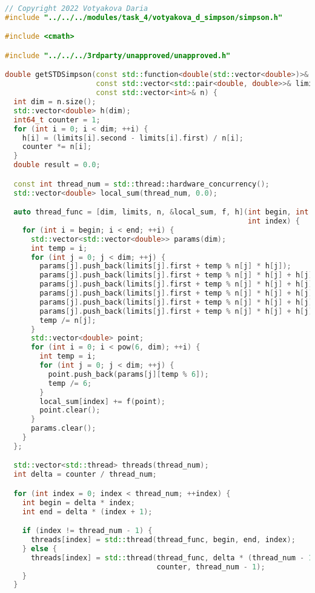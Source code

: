 \documentclass{report}
\begin{document}
\begin{lstlisting}[language=C++]
// Copyright 2022 Votyakova Daria
#include "../../../modules/task_4/votyakova_d_simpson/simpson.h"

#include <cmath>

#include "../../../3rdparty/unapproved/unapproved.h"

double getSTDSimpson(const std::function<double(std::vector<double>)>& f,
                     const std::vector<std::pair<double, double>>& limits,
                     const std::vector<int>& n) {
  int dim = n.size();
  std::vector<double> h(dim);
  int64_t counter = 1;
  for (int i = 0; i < dim; ++i) {
    h[i] = (limits[i].second - limits[i].first) / n[i];
    counter *= n[i];
  }
  double result = 0.0;

  const int thread_num = std::thread::hardware_concurrency();
  std::vector<double> local_sum(thread_num, 0.0);

  auto thread_func = [dim, limits, n, &local_sum, f, h](int begin, int end,
                                                        int index) {
    for (int i = begin; i < end; ++i) {
      std::vector<std::vector<double>> params(dim);
      int temp = i;
      for (int j = 0; j < dim; ++j) {
        params[j].push_back(limits[j].first + temp % n[j] * h[j]);
        params[j].push_back(limits[j].first + temp % n[j] * h[j] + h[j] / 2);
        params[j].push_back(limits[j].first + temp % n[j] * h[j] + h[j] / 2);
        params[j].push_back(limits[j].first + temp % n[j] * h[j] + h[j] / 2);
        params[j].push_back(limits[j].first + temp % n[j] * h[j] + h[j] / 2);
        params[j].push_back(limits[j].first + temp % n[j] * h[j] + h[j]);
        temp /= n[j];
      }
      std::vector<double> point;
      for (int i = 0; i < pow(6, dim); ++i) {
        int temp = i;
        for (int j = 0; j < dim; ++j) {
          point.push_back(params[j][temp % 6]);
          temp /= 6;
        }
        local_sum[index] += f(point);
        point.clear();
      }
      params.clear();
    }
  };

  std::vector<std::thread> threads(thread_num);
  int delta = counter / thread_num;

  for (int index = 0; index < thread_num; ++index) {
    int begin = delta * index;
    int end = delta * (index + 1);

    if (index != thread_num - 1) {
      threads[index] = std::thread(thread_func, begin, end, index);
    } else {
      threads[index] = std::thread(thread_func, delta * (thread_num - 1),
                                   counter, thread_num - 1);
    }
  }


\end{lstlisting}
\end{document}
